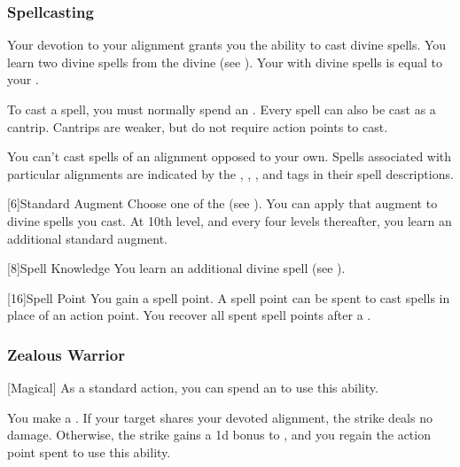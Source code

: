         \subsubsection{Spellcasting}

            Your devotion to your alignment grants you the ability to cast divine spells.
            You learn two divine spells from the divine  (see ).
            Your  with divine spells is equal to your .

            To cast a spell, you must normally spend an .
            Every spell can also be cast as a cantrip.
            Cantrips are weaker, but do not require action points to cast.

            You can't cast spells of an alignment opposed to your own.
            Spells associated with particular alignments are indicated by the , , , and  tags in their spell descriptions.

            [6]{Standard Augment}
            Choose one of the  (see ).
            You can apply that augment to divine spells you cast.
            At 10th level, and every four levels thereafter, you learn an additional standard augment.

            [8]{Spell Knowledge}
            You learn an additional divine spell (see ).

            [16]{Spell Point} 
            You gain a spell point.
            A spell point can be spent to cast spells in place of an action point.
            You recover all spent spell points after a .

        \subsubsection{Zealous Warrior}
            [Magical] As a standard action, you can spend an  to use this ability.
            \begin{ability}
                \begin{spelleffects}
                    \spelleffect You make a .
                    If your target shares your devoted alignment, the strike deals no damage.
                    Otherwise, the strike gains a \plus1d bonus to , and you regain the action point spent to use this ability.
                \end{spelleffects}
            \end{ability}

